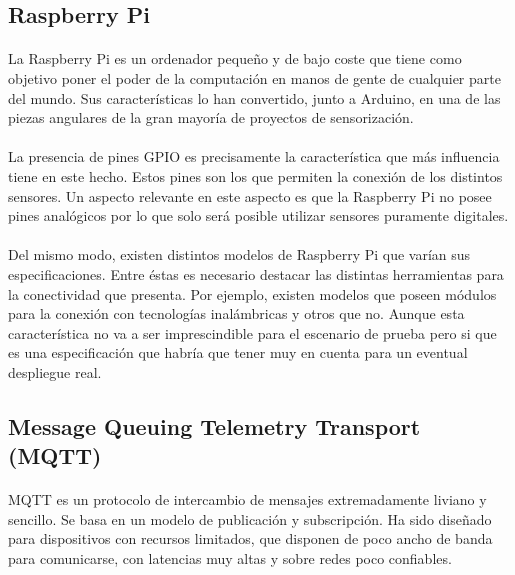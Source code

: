 \documentclass[12pt, a4paper]{article}
\begin{document}
        \subsection{Raspberry Pi}
        
        \paragraph{}
        La Raspberry Pi es un ordenador pequeño y de bajo coste que tiene como objetivo poner el poder de la computación en manos de gente de cualquier parte del mundo. Sus características lo han convertido, junto a Arduino, en una de las piezas angulares de la gran mayoría de proyectos de sensorización.

        \paragraph{}
        La presencia de pines GPIO \cite{gpio} es precisamente la característica que más influencia tiene en este hecho. Estos pines son los que permiten la conexión de los distintos sensores. Un aspecto relevante en este aspecto es que la Raspberry Pi no posee pines analógicos por lo que solo será posible utilizar sensores puramente digitales.

        \paragraph{}
        Del mismo modo, existen distintos modelos de Raspberry Pi que varían sus especificaciones. Entre éstas es necesario destacar las distintas herramientas para la conectividad que presenta. Por ejemplo, existen modelos que poseen módulos para la conexión con tecnologías inalámbricas y otros que no. Aunque esta característica no va a ser imprescindible para el escenario de prueba pero si que es una especificación que habría que tener muy en cuenta para un eventual despliegue real.

        \subsection{Message Queuing Telemetry Transport (MQTT)}
        
        \paragraph{}
        MQTT es un protocolo de intercambio de mensajes extremadamente liviano y sencillo. Se basa en un modelo de publicación y subscripción. Ha sido diseñado para dispositivos con recursos limitados, que disponen de poco ancho de banda para comunicarse, con latencias muy altas y sobre redes poco confiables.
\end{document}
